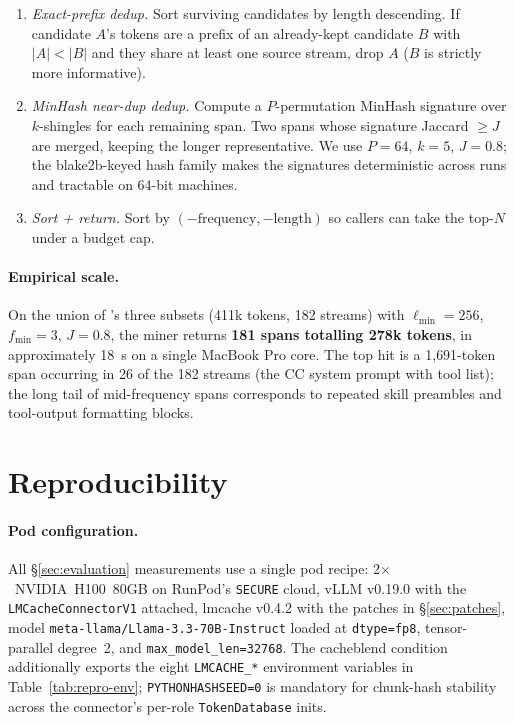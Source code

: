\begin{algorithm}[h]
\begin{enumerate}
  \item[6.] \emph{Exact-prefix dedup.} Sort surviving candidates by
    length descending. If candidate $A$'s tokens are a prefix of an
    already-kept candidate $B$ with $|A| < |B|$ and they share at
    least one source stream, drop $A$ ($B$ is strictly more
    informative).

  \item[7.] \emph{MinHash near-dup dedup.} Compute a $P$-permutation
    MinHash signature over $k$-shingles for each remaining span. Two
    spans whose signature Jaccard $\geq J$ are merged, keeping the
    longer representative. We use $P{=}64$, $k{=}5$, $J{=}0.8$; the
    blake2b-keyed hash family makes the signatures deterministic
    across runs and tractable on 64-bit machines.

  \item[8.] \emph{Sort + return.} Sort by
    $(-\text{frequency}, -\text{length})$ so callers can take the
    top-$N$ under a budget cap.
\end{enumerate}
\caption{\texttt{mine\_spans}: extract length-$\geq{}\ell_{\min}$,
frequency-$\geq{}f_{\min}$ near-deduped repeated sequences from
a multi-stream token corpus.}
\label{alg:miner}
\end{algorithm}

\paragraph{Empirical scale.} On the union of
\dataset's three subsets (411k tokens, 182 streams) with
$\ell_{\min}=256$, $f_{\min}=3$, $J=0.8$, the miner returns
\textbf{181 spans totalling 278k tokens}, in approximately 18~s on
a single MacBook Pro core. The top hit is a 1{,}691-token span
occurring in 26 of the 182 streams (the CC system prompt with tool
list); the long tail of mid-frequency spans corresponds to repeated
skill preambles and tool-output formatting blocks.

\section{Reproducibility}
\label{app:reproducibility}

\paragraph{Pod configuration.} All \S\ref{sec:evaluation} measurements
use a single pod recipe: \mbox{2$\times$~NVIDIA~H100~80GB} on RunPod's
\texttt{SECURE} cloud, vLLM v0.19.0 with the
\texttt{LMCacheConnectorV1} attached, lmcache v0.4.2 with the
patches in \S\ref{sec:patches}, model
\texttt{meta-llama/Llama-3.3-70B-\allowbreak{}Instruct} loaded at
\texttt{dtype=fp8}, tensor-parallel degree~2, and
\texttt{max\_model\_len=32768}. The cacheblend condition additionally
exports the eight \texttt{LMCACHE\_*} environment variables in
Table~\ref{tab:repro-env}; \texttt{PYTHONHASHSEED=0} is mandatory
for chunk-hash stability across the connector's per-role
\texttt{TokenDatabase} inits.

